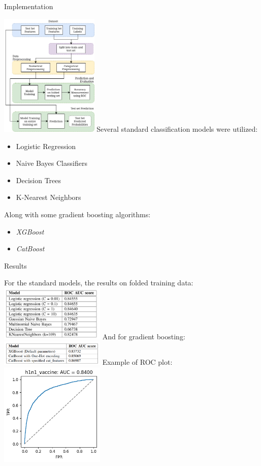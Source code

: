 \documentclass[dvipsnames, handout]{beamer}
\newcommand{\1}{\mathds{1}}	%
\begin{document}
\begin{frame}{Implementation}
    \begin{multicols}{2}
        \includegraphics[width = 4.7cm]{MethodologyStructure.png}
        Several standard classification models were utilized:
        \begin{itemize}
            \item Logistic Regression
            \item Naive Bayes Classifiers
            \item Decision Trees
            \item K-Nearest Neighbors
        \end{itemize}
        \pause
        Along with some gradient boosting algorithms:
        \begin{itemize}
            \item \textit{XGBoost}
            \item \textit{CatBoost}
        \end{itemize}
    \end{multicols}
\end{frame}


\begin{frame}{Results}
    \begin{multicols*}{2}
        For the standard models, the results on folded training data:
        \includegraphics[width=5cm]{results1.png}
        And for gradient boosting:
        \includegraphics[width=5cm]{results2.png}
        Example of ROC plot:
        \includegraphics[width=5cm]{ROC.png}
    \end{multicols*}
\end{frame}
\end{document}
